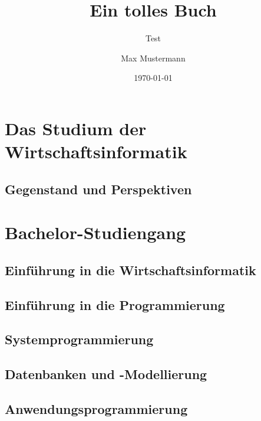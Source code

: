 \documentclass{hswbook}
\author{Max Mustermann}
\date{\today}
\title{Ein tolles Buch}
\subtitle{Test}
\begin{document}
\maketitle

\clearpage
    
\clearpage
\tableofcontents
\listoffigures
\listoftables



\part{Das Studium der Wirtschaftsinformatik}
    \chapter{Gegenstand und Perspektiven}
    \chapter{}

\part{Bachelor-Studiengang}
    \chapter{Einführung in die Wirtschaftsinformatik}
    \chapter{Einführung in die Programmierung}
    \chapter{Systemprogrammierung}
    \chapter{Datenbanken und -Modellierung}
    \chapter{Anwendungsprogrammierung}
\end{document}
